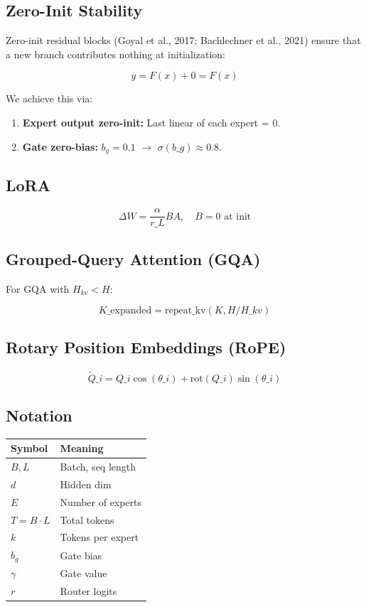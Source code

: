 \subsection{Zero-Init Stability}

Zero-init residual blocks (Goyal et al., 2017; Bachlechner et al., 2021) 
ensure that a new branch contributes nothing at initialization:

\[
y = F(x) + 0 = F(x)
\tag{3.8}
\]

We achieve this via:

\begin{enumerate}
\item \textbf{Expert output zero-init:} Last linear of each expert = 0.
\item \textbf{Gate zero-bias:} $b_g = 0.1$ $\to$ $\sigma(b\_g) \approx
  0.8$.

\end{enumerate}
\subsection{LoRA}

\[
\Delta W = \frac{\alpha}{r\_L} B A, \quad B = 0 \text{ at init}
\tag{3.9}
\]

\subsection{Grouped-Query Attention (GQA)}

For GQA with $H_{kv} < H$:

\[
K\_\text{expanded} = \text{repeat\_kv}(K, H / H\_{kv})
\tag{3.10}
\]

\subsection{Rotary Position Embeddings (RoPE)}

\[
\tilde{Q}\_i = Q\_i \cos(\theta\_i) + \text{rot}(Q\_i) \sin(\theta\_i)
\tag{3.11}
\]

\subsection{Notation}

\begin{table}[H]
\centering
\small
\begin{tabular}{ll}
\toprule
\textbf{Symbol} & \textbf{Meaning} \\
\midrule
$B, L$ & Batch, seq length \\
$d$ & Hidden dim \\
$E$ & Number of experts \\
$T = B \cdot L$ & Total tokens \\
$k$ & Tokens per expert \\
$b_g$ & Gate bias \\
$\gamma$ & Gate value \\
$r$ & Router logits \\
\bottomrule
\end{tabular}
\end{table}

